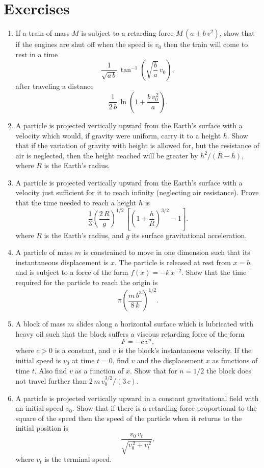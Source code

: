 \section{Exercises}
{\small
\renewcommand{\theenumi}{3.\arabic{enumi}}
\begin{enumerate}
\item If a train of mass $M$ is subject to a retarding force $M\,(a+b\,v^2)$, show that if
the engines are shut off when the speed is $v_0 $ then the train will
come to rest in a time
$$
\frac{1}{\sqrt{a\,b}}\,\tan^{-1}\left(\sqrt{\frac{b}{a}}\,v_0\right),
$$
after traveling a distance
$$
\frac{1}{2\,b}\,\ln\left(1+\frac{b\,v_0^{\,2}}{a}\right).
$$

\item A particle is projected vertically upward from the Earth's surface with a 
velocity which would, if gravity were uniform, carry it to a height $h$.
Show that if the variation of gravity with height is allowed for, but the
resistance of air is neglected, then the height reached will be greater by $h^2/(R-h)$, where
$R$ is the Earth's radius. 

\item A particle is projected vertically upward from the Earth's surface with a velocity
just sufficient for it to reach infinity (neglecting air resistance). Prove that the time needed to
reach a height $h$ is
$$
\frac{1}{3}\left(\frac{2\,R}{g}\right)^{1/2}\,\left[\left(1+\frac{h}{R}\right)^{3/2}-1\right].
$$
where $R$ is the Earth's radius, and $g$ its surface gravitational acceleration.

\item A particle of mass $m$ is constrained to move in one dimension such that its instantaneous displacement is $x$. The particle is 
 released at rest from $x=b$, and is
 subject to a force of the form  $f(x) = - k\,x^{-2}$. Show that the time required
for the particle to reach the origin is
$$
\pi\left(\frac{m\,b^3}{8\,k}\right)^{1/2}.
$$
\item A block of mass $m$ slides along a horizontal surface which is lubricated with
heavy oil such that the block suffers a viscous retarding force
of the form
$$
F = - c\,v^n,
$$
where $c>0$ is a constant, and $v$ is the block's instantaneous velocity.
If the initial speed is $v_0$ at time $t=0$, find $v$ and the displacement
$x$ as functions of time $t$. Also find $v$ as a function of $x$. Show
that for $n=1/2$ the block does not travel further than $2\,m\,v_0^{3/2}/(3\,c)$.

 \item A particle is projected vertically upward in a constant gravitational
 field with an initial speed $v_0$. Show that if there is a retarding force
 proportional to the square of the speed then the speed of the
 particle when it returns to the initial position is
 $$
 \frac{v_0\,v_t}{\sqrt{v_0^{\,2} + v_t^{\,2}}},
 $$
 where $v_t$ is the terminal speed.
 

\end{enumerate}}
